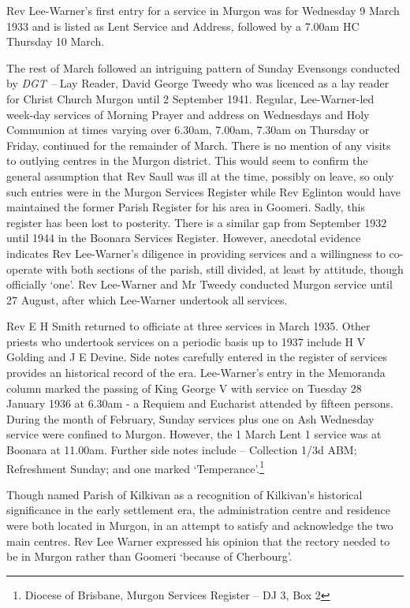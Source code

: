 Rev Lee-Warner's first entry for a service in Murgon was for Wednesday 9 March 1933 and is listed as Lent Service and Address\emph{,} followed by a 7.00am HC Thursday 10 March.

The rest of March followed an intriguing pattern of Sunday Evensongs conducted by \emph{DGT --} Lay Reader, David George Tweedy who was licenced as a lay reader for Christ Church Murgon until 2 September 1941. Regular, Lee-Warner-led week-day services of Morning Prayer and address on Wednesdays and Holy Communion at times varying over 6.30am, 7.00am, 7.30am on Thursday or Friday, continued for the remainder of March. There is no mention of any visits to outlying centres in the Murgon district. This would seem to confirm the general assumption that Rev Saull was ill at the time, possibly on leave, so only such entries were in the Murgon Services Register while Rev Eglinton would have maintained the former Parish Register for his area in Goomeri. Sadly, this register has been lost to posterity. There is a similar gap from September 1932 until 1944 in the Boonara Services Register. However, anecdotal evidence indicates Rev Lee-Warner's diligence in providing services and a willingness to co-operate with both sections of the parish, still divided, at least by attitude, though officially `one'. Rev Lee-Warner and Mr Tweedy conducted Murgon service until 27 August, after which Lee-Warner undertook all services.

Rev E H Smith returned to officiate at three services in March 1935. Other priests who undertook services on a periodic basis up to 1937 include H V Golding and J E Devine. Side notes carefully entered in the register of services provides an historical record of the era. Lee-Warner's entry in the Memoranda column marked the passing of King George V with service on Tuesday 28 January 1936 at 6.30am - a Requiem and Eucharist attended by fifteen persons. During the month of February, Sunday services plus one on Ash Wednesday service were confined to Murgon. However, the 1 March Lent 1 service was at Boonara at 11.00am. Further side notes include -- Collection 1/3d ABM; Refreshment Sunday; and one marked `Temperance'.\footnote{Diocese of Brisbane, Murgon Services Register -- DJ 3, Box 2}

Though named Parish of Kilkivan as a recognition of Kilkivan's historical significance in the early settlement era, the administration centre and residence were both located in Murgon, in an attempt to satisfy and acknowledge the two main centres. Rev Lee Warner expressed his opinion that the rectory needed to be in Murgon rather than Goomeri `because of Cherbourg'.

